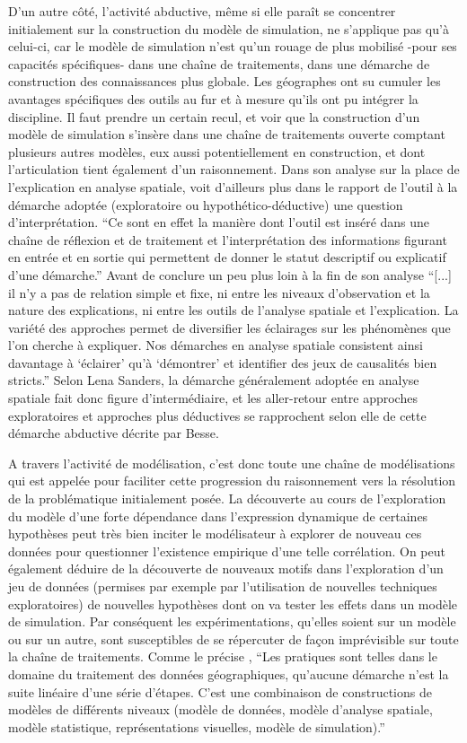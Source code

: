 D'un autre côté, l'activité abductive, même si elle paraît se concentrer initialement sur la construction du modèle de simulation, ne s'applique pas qu'à celui-ci, car le modèle de simulation n'est qu'un rouage de plus mobilisé -pour ses capacités spécifiques- dans une chaîne de traitements, dans une démarche de construction des connaissances plus globale. Les géographes ont su cumuler les avantages spécifiques des outils au fur et à mesure qu'ils ont pu intégrer la discipline. Il faut prendre un certain recul, et voir que la construction d'un modèle de simulation s'insère dans une chaîne de traitements ouverte comptant plusieurs autres modèles, eux aussi potentiellement en construction, et dont l'articulation tient également d'un raisonnement. Dans son analyse sur la place de l'explication en analyse spatiale, \textcite{Sanders2000} voit d'ailleurs plus dans le rapport de l'outil à la démarche adoptée (exploratoire ou hypothético-déductive) une question d'interprétation. \enquote{Ce sont en effet la manière dont l'outil est inséré dans une chaîne de réflexion et de traitement et l'interprétation des informations figurant en entrée et en sortie qui permettent de donner le statut descriptif ou explicatif d'une démarche.} Avant de conclure un peu plus loin à la fin de son analyse \enquote{[...] il n'y a pas de relation simple et fixe, ni entre les niveaux d'observation et la nature des explications, ni entre les outils de l'analyse spatiale et l'explication. La variété des approches permet de diversifier les éclairages sur les phénomènes que l'on cherche à expliquer. Nos démarches en analyse spatiale consistent ainsi davantage à \enquote{éclairer} qu'à \enquote{démontrer} et identifier des jeux de causalités bien stricts.} Selon Lena Sanders, la démarche généralement adoptée en analyse spatiale fait donc figure d'intermédiaire, et les aller-retour entre approches exploratoires et approches plus déductives se rapprochent selon elle de cette démarche abductive décrite par Besse.

A travers l'activité de modélisation, c'est donc toute une chaîne de modélisations qui est appelée pour faciliter cette progression du raisonnement vers la résolution de la problématique initialement posée. La découverte au cours de l'exploration du modèle d'une forte dépendance dans l'expression dynamique de certaines hypothèses peut très bien inciter le modélisateur à explorer de nouveau ces données pour questionner l'existence empirique d'une telle corrélation. On peut également déduire de la découverte de nouveaux motifs dans l'exploration d'un jeu de données (permises par exemple par l'utilisation de nouvelles techniques exploratoires) de nouvelles hypothèses dont on va tester les effets dans un modèle de simulation. Par conséquent les expérimentations, qu'elles soient sur un modèle ou sur un autre, sont susceptibles de se répercuter de façon imprévisible sur toute la chaîne de traitements. Comme le précise \textcite[63]{Mathian2014}, \enquote{Les pratiques sont telles dans le domaine du traitement des données géographiques, qu'aucune démarche n'est la suite linéaire d'une série d'étapes. C'est une combinaison de constructions de modèles de différents niveaux (modèle de données, modèle d'analyse spatiale, modèle statistique, représentations visuelles, modèle de simulation).}

